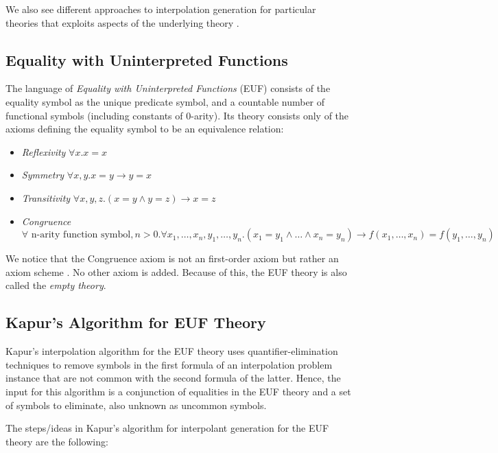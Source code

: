 \documentclass[10pt, sigconf,authordraft]{acmart}
\begin{document}
We also see different approaches to interpolation generation for particular
theories that exploits aspects of the underlying theory
\cite{10.1007/978-3-540-69738-1_25, 10.1007/11814771_21}.

\subsection{Equality with Uninterpreted Functions}

The language of \emph{Equality with Uninterpreted Functions} (EUF) consists of the
equality symbol as the unique predicate symbol, and a countable number of functional
symbols (including constants of 0-arity). Its theory consists only of the axioms
defining the equality symbol to be an equivalence relation:

\begin{itemize}
\item \emph{Reflexivity} $\forall x . x = x$
\item \emph{Symmetry} $\forall x, y . x = y \rightarrow y = x$
\item \emph{Transitivity} $\forall x, y, z . (x = y \land y = z) \rightarrow x = z$
\item \emph{Congruence} $\forall \text{ n-arity function symbol}, n > 0 . \forall x_1,
  \dots, x_n, y_1, \dots, y_n . (x_1 = y_1 \land \dots \land x_n = y_n) \rightarrow
  f(x_1, \dots, x_n) = f(y_1, \dots, y_n)$
\end{itemize}

We notice that the Congruence axiom is not an first-order axiom but rather an axiom
scheme \cite{10.1145/322186.322198}. No other axiom is added. Because of this,
the EUF theory is also called the \emph{empty theory}.

\subsection{Kapur's Algorithm for EUF Theory}

Kapur's interpolation algorithm for the EUF theory uses quantifier-elimination
techniques to remove symbols in the first formula of an interpolation problem instance
that are not common with the second formula of the latter. 
Hence, the input for this algorithm is a conjunction of equalities in the
EUF theory and a set of symbols to eliminate, also unknown as uncommon symbols.

The steps/ideas in Kapur's algorithm for interpolant generation for the EUF theory
are the following:
\end{document}
